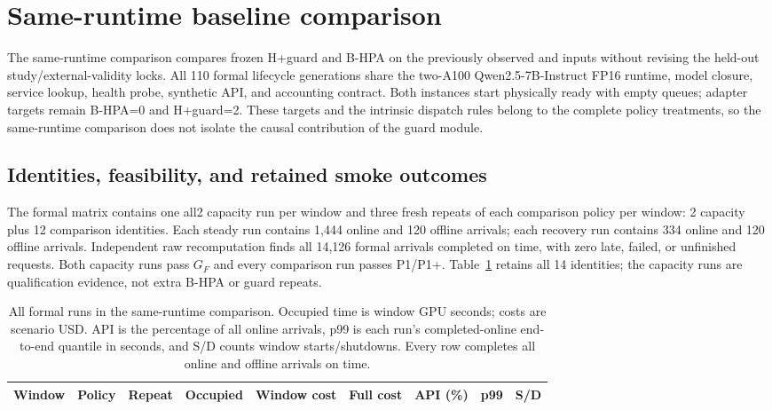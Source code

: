 \section{Same-runtime baseline comparison}
\label{app:e1}
The same-runtime comparison compares frozen H+guard and B-HPA on the previously observed
 and 
inputs without revising the held-out study/external-validity locks. All 110 formal lifecycle generations
share the two-A100 Qwen2.5-7B-Instruct FP16 runtime, model closure, service lookup,
health probe, synthetic API, and accounting contract. Both instances start
physically ready with empty queues; adapter targets remain B-HPA=0 and H+guard=2.
These targets and the intrinsic dispatch rules belong to the complete policy
treatments, so the same-runtime comparison does not isolate the causal contribution of the guard module.

\subsection{Identities, feasibility, and retained smoke outcomes}
The formal matrix contains one all2 capacity run per window and three fresh
repeats of each comparison policy per window: 2 capacity plus 12 comparison
identities. Each steady run contains 1,444 online and 120 offline arrivals;
each recovery run contains 334 online and 120 offline arrivals. Independent raw
recomputation finds all 14,126 formal arrivals completed on time, with zero late,
failed, or unfinished requests. Both capacity runs pass $G_F$ and every comparison
run passes P1/P1+. Table~\ref{tab:e1runs} retains all 14 identities; the capacity
runs are qualification evidence, not extra B-HPA or guard repeats.

\begin{table}[t]
\centering
\small
\caption{All formal runs in the same-runtime comparison. Occupied time is window GPU seconds; costs
are scenario USD. API is the percentage of all online arrivals, p99 is each
run's completed-online end-to-end quantile in seconds, and S/D counts window
starts/shutdowns. Every row completes all online and offline arrivals on time.}
\label{tab:e1runs}
\setlength{\tabcolsep}{3pt}
\par\vspace{4pt}
\begin{tabular*}{0.92\linewidth}{@{\extracolsep{\fill}}lllrrrrrr@{}}
\toprule
Window & Policy & Repeat & Occupied & Window cost & Full cost & API (\%) & p99 & S/D\\
\midrule

\end{tabular*}
\end{table}

